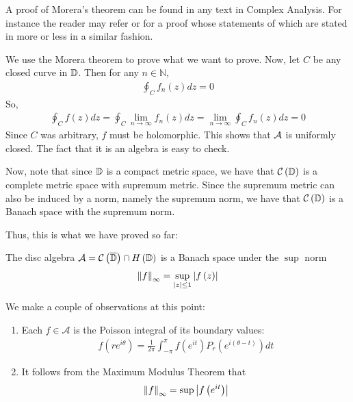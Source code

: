 A proof of Morera's theorem can be found in any text in Complex Analysis. For instance the reader may refer \cite{ash2014complex} or \cite{rudin1987real} for a proof whose statements of which are stated in more or less in a similar fashion.

We use the Morera theorem to prove what we want to prove. Now, let $C$ be any closed curve in $\mathbb D$. Then for any $n\in \mathbb N$,
\begin{align*}
\oint_{C}f_{n}  \left( z \right) dz = 0
\end{align*}
So, 
\begin{align*}
    \oint_{C} f(z) dz = \oint_{C} \lim_{n\to \infty} f_{n} \left( z \right) dz = \lim_{n\to \infty} \oint_{C} f_{n} \left( z \right) dz =0
\end{align*}
Since $C$ was arbitrary, $f$ must be holomorphic. This shows that ${\cal A}$ is uniformly closed. The fact that it is an algebra is easy to check.

Now, note that since $\mathbb D$ is a compact metric space, we have that ${\cal C} \left( \mathbb D \right)$ is a complete metric space with supremum metric. Since the supremum metric can also be induced by a norm, namely the supremum norm, we have that ${\cal C}\left( \mathbb D \right)$ is a Banach space with the supremum  norm.

Thus, this is what we have proved so far:

\begin{theorem}
    The disc algebra ${\cal A} ={\cal C} \left( \overline{ \mathbb D } \right) \cap H \left( \mathbb D \right)$ is a Banach space under the $\sup$ norm
    \begin{align*}
	\left\lVert f \right\rVert_{\infty} = \sup_{\left\lvert z \right\rvert\le 1} \left\lvert f\left( z \right) \right\rvert
    \end{align*}
    \label{thm:disc-algebra-is-B-space}
\end{theorem}

We make a couple of observations at this point:
\begin{enumerate}
    \item Each $f\in \mathcal A$ is the Poisson integral of its boundary values:
\begin{align*}
    f\left( re^{i\theta} \right) = \frac{1}{2\pi} \int_{-\pi}^{\pi} f\left( e^{it} \right) P_{r} \left( e^{i \left( \theta -t \right)} \right) dt
\end{align*}
\item It follows from the Maximum Modulus Theorem that 
    \begin{align*}
	\left\lVert f \right\rVert_{\infty} = \sup \left\lvert f\left( e^{it} \right) \right\rvert
    \end{align*}
\end{enumerate}

